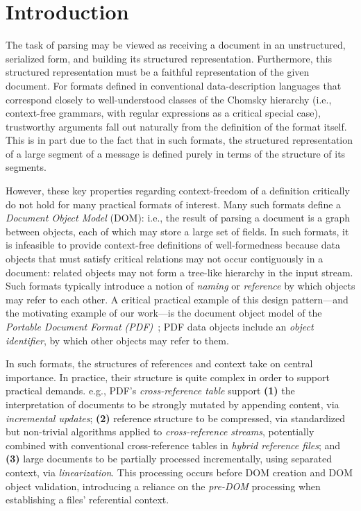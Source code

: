 \section{Introduction}
\label{sec:intro}
The task of parsing may be viewed as receiving a document in an
unstructured, serialized form, and building its structured
representation. Furthermore, this structured representation must be a
faithful representation of the given document.
%
For formats defined in conventional data-description languages that
correspond closely to well-understood classes of the Chomsky hierarchy
(i.e., context-free grammars, with regular expressions as a critical
special case), trustworthy arguments fall out naturally from the
definition of the format itself.
%
This is in part due to the fact that in such formats, the structured
representation of a large segment of a message is defined purely in
terms of the structure of its segments.

However, these key properties regarding context-freedom of a
definition critically do not hold for many practical formats of
interest.
%
Many such formats define a \emph{Document Object Model} (DOM): i.e., the
result of parsing a document is a graph between objects, each
of which may store a large set of fields.
%
In such formats, it is infeasible to provide context-free definitions
of well-formedness because data objects that must satisfy critical
relations may not occur contiguously in a document: related objects
may not form a tree-like hierarchy in the input stream.
%
Such formats typically introduce a notion of \emph{naming} or
\emph{reference} by which objects may refer to each other.
%
A critical practical example of this design pattern---and the
motivating example of our work---is the document object model of the
\emph{Portable Document Format (PDF)}~\cite{isotc171sc2wg8ISO32000220202020};
%
PDF data objects include an \emph{object identifier}, by which other
objects may refer to them.

In such formats, the structures of references and context take on
central importance.
%
In practice, their structure is quite complex in order to support
practical demands.
%
e.g., PDF's \emph{cross-reference table} support
% 
\textbf{(1)} the interpretation of documents to be strongly mutated by
appending content, via \emph{incremental updates};
%
\textbf{(2)} reference structure to be compressed, via standardized
but non-trivial algorithms applied to \emph{cross-reference streams},
potentially combined with conventional cross-reference tables in
\emph{hybrid reference files}; and
% 
\textbf{(3)} large documents to be partially processed incrementally,
using separated context, via \emph{linearization}. This processing
occurs before DOM creation and DOM object validation, introducing a
reliance on the \emph{pre-DOM} processing when establishing 
a files' referential context.


